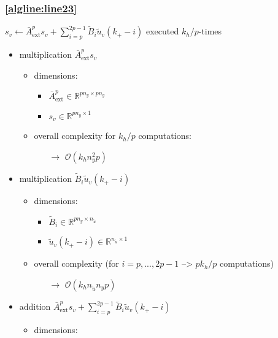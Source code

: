 \documentclass{article}
\begin{document}
\subsubsection{\cref{algline:line23}} 
$s_v \gets \bar{A}_\text{ext}^{p} s_v  + \sum_{i=p}^{2p-1} \tilde{B}_{i} \tilde{u}_v(k_+-i)$ 
executed $k_h/p$-times
\begin{itemize}
    \item multiplication $\bar{A}_\text{ext}^{p} s_v$
    \begin{itemize}
        \item dimensions:
        \begin{itemize}
            \item $\bar{A}_\text{ext}^{p} \in \mathbb{R}^{pn_y \times pn_y}$
            \item $s_v \in \mathbb{R}^{pn_y \times 1}$
        \end{itemize}
        \item overall complexity for $k_h/p$ computations: %
        \begin{itemize}
            \item[$\rightarrow$] $\mathcal{O}(k_h n_y^2 p)$
        \end{itemize}
    \end{itemize}
    \item multiplication $\tilde{B}_{i} \tilde{u}_v(k_+-i)$
    \begin{itemize}
        \item dimensions:
        \begin{itemize}
            \item $\tilde{B}_{i} \in \mathbb{R}^{pn_y \times n_{\tilde{u}}}$
            \item $\tilde{u}_v(k_+-i) \in \mathbb{R}^{n_{\tilde{u}} \times 1}$
        \end{itemize}
        \item overall complexity (for $i=p,...,2p-1$ --> $p k_h/p$ computations)
        \begin{itemize}
            \item[$\rightarrow$] $\mathcal{O}(k_h n_{\tilde{u}} n_y p)$
        \end{itemize}
    \end{itemize}
    \item addition $\bar{A}_\text{ext}^{p} s_v  + \sum_{i=p}^{2p-1} \tilde{B}_{i} \tilde{u}_v(k_+-i)$
    \begin{itemize}
        \item dimensions:

\end{itemize}
\end{itemize}
\end{document}
